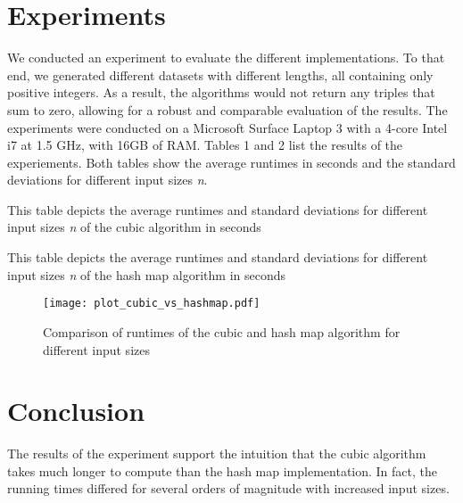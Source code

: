 \documentclass[12pt, a4paper]{article}
\begin{document}
\section{Experiments}

We conducted an experiment to evaluate the different implementations. To that end, we generated different datasets with different lengths, all containing only positive integers. As a result, the algorithms would not return any triples that sum to zero, allowing for a robust and comparable evaluation of the results. \newline
The experiments were conducted on a Microsoft Surface Laptop 3 with a 4-core Intel i7 at 1.5 GHz, with 16GB of RAM. \newline
Tables 1 and 2 list the results of the experiements. Both tables show the average runtimes in seconds and the standard deviations for different input sizes \emph{n}.

\begin{table}[h]
  \begin{center}
  \caption{This table depicts the average runtimes and standard deviations for different input sizes \emph{n} of the cubic algorithm in seconds}
  \label{tbl:resultscubic}
  
  \end{center}
\end{table}

\begin{table}[h]
  \begin{center}
  \caption{This table depicts the average runtimes and standard deviations for different input sizes \emph{n} of the hash map algorithm in seconds}
  \label{tbl:resultshashmap}
  
  \end{center}
\end{table}

\begin{figure}[h]
  \begin{center}
    \texttt{[image: plot\_cubic\_vs\_hashmap.pdf]}
    \caption{Comparison of runtimes of the cubic and hash map algorithm for different input sizes}
    \label{fig:runtimes}
  \end{center}
\end{figure}

\clearpage

\section{Conclusion}
The results of the experiment support the intuition that the cubic algorithm takes much longer to compute than the hash map implementation. In fact, the running times differed for several orders of magnitude with increased input sizes.
\end{document}
